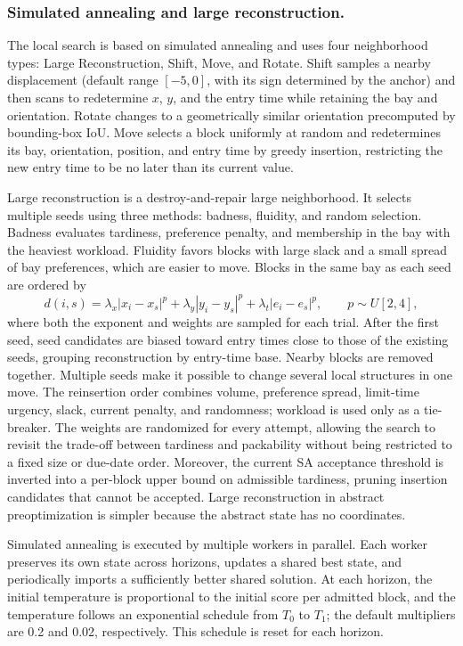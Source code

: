 \documentclass[runningheads]{llncs}
\begin{document}
\subsubsection{Simulated annealing and large reconstruction.}
The local search is based on simulated annealing\cite{kirkpatrick1983} and uses four neighborhood types: Large Reconstruction, Shift, Move, and Rotate. Shift samples a nearby displacement (default range $[-5,0]$, with its sign determined by the anchor) and then scans to redetermine $x$, $y$, and the entry time while retaining the bay and orientation. Rotate changes to a geometrically similar orientation precomputed by bounding-box IoU. Move selects a block uniformly at random and redetermines its bay, orientation, position, and entry time by greedy insertion, restricting the new entry time to be no later than its current value.

Large reconstruction is a destroy-and-repair large neighborhood.
It selects multiple seeds using three methods: badness, fluidity, and random
selection. Badness evaluates tardiness, preference penalty, and membership in
the bay with the heaviest workload. Fluidity favors blocks with large slack
and a small spread of bay preferences, which are easier to move. Blocks in the
same bay as each seed are ordered by
\begin{equation}
d(i,s)=\lambda_x|x_i-x_s|^p+\lambda_y|y_i-y_s|^p
+\lambda_t|e_i-e_s|^p,\qquad p\sim U[2,4],
\end{equation}
where both the exponent and weights are sampled for each trial. After the first seed, seed candidates are biased toward entry times close to those of the existing seeds, grouping reconstruction by entry-time base. Nearby blocks are removed together. Multiple seeds make it possible to change several local structures in one move. The reinsertion order combines volume, preference spread, limit-time urgency, slack, current penalty, and randomness; workload is used only as a tie-breaker. The weights are randomized for every attempt, allowing the search to revisit the trade-off between tardiness and packability without being restricted to a fixed size or due-date order. Moreover, the current SA acceptance threshold is inverted into a per-block upper bound on admissible tardiness, pruning insertion candidates that cannot be accepted. Large reconstruction in abstract preoptimization is simpler because the abstract state has no coordinates.

Simulated annealing is executed by multiple workers in parallel. Each worker preserves its own state across horizons, updates a shared best state, and periodically imports a sufficiently better shared solution. At each horizon, the initial temperature is proportional to the initial score per admitted block, and the temperature follows an exponential schedule from $T_0$ to $T_1$; the default multipliers are 0.2 and 0.02, respectively. This schedule is reset for each horizon.
\end{document}
